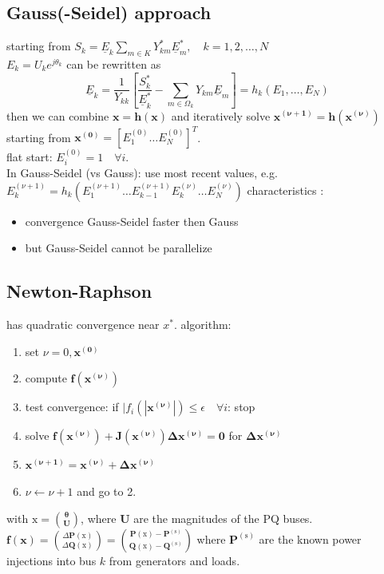 \documentclass[a4paper,10pt,landscape]{scrartcl}
\begin{document}
\begin{multicols*}{3}
\subsection{Gauss(-Seidel) approach}
starting from $S_k=\underline{E}_k \sum_{m \in K} Y_{k m}^* \underline{E}_m^*, \quad k=1,2, \ldots, N$ \\
$E_k=U_k e^{j\theta_k}$ can be rewritten as
$$\underline{E}_k=\frac{1}{Y_{k k}}\left[\frac{S_k^*}{\underline{E}_k^*}-\sum_{m \in \Omega_k} Y_{k m} \underline{E}_m\right]=h_k(E_1,\dots,E_N)$$
then we can combine $\mathbf{x=h(x)}$ and iteratively solve $\mathbf{x^{(\nu+1)}=h(x^{(\nu)})}$
starting from $\mathbf{x^{(0)}}=[E_1^{(0)} \dots E_N^{(0)}]^T$. \\
flat start: $E_i^{(0)}=1\quad\forall i$.\\
In Gauss-Seidel (vs Gauss): use most recent values, e.g. $E_k^{(\nu+1)}=h_k(E_1^{(\nu+1)} \dots E_{k-1}^{(\nu+1)} E_k^{(\nu)} \dots E_N^{(\nu)})$
characteristics :
\begin{itemize} 
    \item convergence Gauss-Seidel faster then Gauss
    \item but Gauss-Seidel cannot be parallelize
\end{itemize}

\subsection{Newton-Raphson}
has quadratic convergence near $x^*$. algorithm:
\begin{enumerate}
    \item set $\nu=0,\mathbf{x^{(0)}}$
    \item compute $\mathbf{f(x^{(\nu)})}$
    \item test convergence: if $|f_i(|\mathbf{x^{(\nu)}}|)\leq \epsilon\quad\forall i$: stop
    \item solve $\mathbf{f(x^{(\nu)}) + J(x^{(\nu)})\Delta x^{(\nu)}=0}$ for $\mathbf{\Delta x^{(\nu)}}$
    \item $\mathbf{x^{(\nu+1)} = x^{(\nu)} + \Delta x^{(\nu)}}$
    \item $\nu\leftarrow \nu+1$ and go to 2.
\end{enumerate}
with $\mathrm{x}=\binom{\boldsymbol{\theta}}{\mathbf{U}}$, where $\mathbf{U}$ are the magnitudes of the PQ buses. 
$\mathbf{f}(\mathbf{x})=\binom{\Delta \mathbf{P}(\mathrm{x})}{\Delta \mathbf{Q}(\mathrm{x})}=\binom{\mathbf{P}(\mathrm{x})-\mathbf{P}^{(\mathrm{s})}}{\mathbf{Q}(\mathrm{x})-\mathbf{Q}^{(\mathrm{s})}}$
where $\mathbf{P}^{(\mathrm{s})}$ are the known power injections into bus $k$ from generators and loads.


\end{multicols*}
\end{document}
